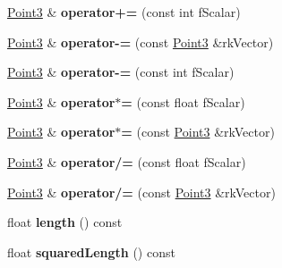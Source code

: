 \begin{DoxyCompactItemize}
\item 
\hypertarget{classPoint3_aeaf0a5b6b31f6d9f5b9f7f54b040deb9}{
\hyperlink{classPoint3}{\-Point3} \& {\bfseries operator+=} (const int f\-Scalar)}
\label{d4/d36/classPoint3_aeaf0a5b6b31f6d9f5b9f7f54b040deb9}

\item 
\hypertarget{classPoint3_ae9c5b4db0265a6efc3daec65601bbcf2}{
\hyperlink{classPoint3}{\-Point3} \& {\bfseries operator-\/=} (const \hyperlink{classPoint3}{\-Point3} \&rk\-Vector)}
\label{d4/d36/classPoint3_ae9c5b4db0265a6efc3daec65601bbcf2}

\item 
\hypertarget{classPoint3_a869efa2969cbaa268b9bfbfe0c0ecaf5}{
\hyperlink{classPoint3}{\-Point3} \& {\bfseries operator-\/=} (const int f\-Scalar)}
\label{d4/d36/classPoint3_a869efa2969cbaa268b9bfbfe0c0ecaf5}

\item 
\hypertarget{classPoint3_a09bf9637e853e17236978b56439c861b}{
\hyperlink{classPoint3}{\-Point3} \& {\bfseries operator$\ast$=} (const float f\-Scalar)}
\label{d4/d36/classPoint3_a09bf9637e853e17236978b56439c861b}

\item 
\hypertarget{classPoint3_a532b452141500e87ee0f42cd1c415131}{
\hyperlink{classPoint3}{\-Point3} \& {\bfseries operator$\ast$=} (const \hyperlink{classPoint3}{\-Point3} \&rk\-Vector)}
\label{d4/d36/classPoint3_a532b452141500e87ee0f42cd1c415131}

\item 
\hypertarget{classPoint3_a4ac26360af1e8e6bdb10215dcbde846e}{
\hyperlink{classPoint3}{\-Point3} \& {\bfseries operator/=} (const float f\-Scalar)}
\label{d4/d36/classPoint3_a4ac26360af1e8e6bdb10215dcbde846e}

\item 
\hypertarget{classPoint3_af671909bde78fca5cd14687352ee4236}{
\hyperlink{classPoint3}{\-Point3} \& {\bfseries operator/=} (const \hyperlink{classPoint3}{\-Point3} \&rk\-Vector)}
\label{d4/d36/classPoint3_af671909bde78fca5cd14687352ee4236}

\item 
\hypertarget{classPoint3_a889c17c6d82476d5a01cb4ed76af1cd9}{
float {\bfseries length} () const }
\label{d4/d36/classPoint3_a889c17c6d82476d5a01cb4ed76af1cd9}

\item 
\hypertarget{classPoint3_a3648924ff25a8e33afd59dc10d346dc1}{
float {\bfseries squared\-Length} () const }
\label{d4/d36/classPoint3_a3648924ff25a8e33afd59dc10d346dc1}


\end{DoxyCompactItemize}
